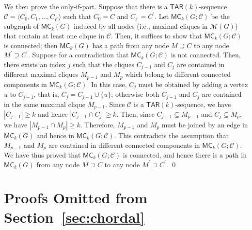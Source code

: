 \documentclass{llncs}
\newcommand{\MC}[2]{\mathsf{MC}_{#1}(#2)}
\newcommand{\TAR}[1]{\mathsf{TAR}(#1)}
\newcommand{\cliq}{C}
\newcommand{\Mset}[1]{\mathcal{M}(#1)}
\newcounter{one}
\begin{document}
	We then prove the only-if-part.
	Suppose that there is a $\TAR{k}$-sequence $\mathcal{C} = \langle \cliq_{0}, \cliq_{1}, \ldots, \cliq_{\ell^\prime} \rangle$ such that $\cliq_{0} = \cliq$ and $\cliq_{\ell^\prime} = \cliq^\prime$.
	Let $\MC{k}{G; \mathcal{C}}$ be the subgraph of $\MC{k}{G}$ induced by all nodes (i.e., maximal cliques in $\Mset{G}$) that contain at least one clique in $\mathcal{C}$.
	Then, it suffices to show that $\MC{k}{G; \mathcal{C}}$ is connected;
then $\MC{k}{G}$ has a path from any node $M \supseteq \cliq$ to any node $M^\prime \supseteq \cliq^\prime$. 
	Suppose for a contradiction that $\MC{k}{G; \mathcal{C}}$ is not connected. 
	Then, there exists an index $j$ such that the cliques $\cliq_{j-1}$ and $\cliq_j$ are contained in different maximal cliques $M_{p-1}$ and $M_p$ which belong to different connected components in $\MC{k}{G; \mathcal{C}}$. 
	In this case, $\cliq_{j}$ must be obtained by adding a vertex $u$ to $\cliq_{j-1}$, that is, $\cliq_{j} = \cliq_{j-1} \cup \{ u\}$;
otherwise both $\cliq_{j-1}$ and $\cliq_j$ are contained in the same maximal clique $M_{p-1}$.
	Since $\mathcal{C}$ is a $\TAR{k}$-sequence, we have $|\cliq_{j-1}| \ge k$ and hence $|\cliq_{j-1} \cap \cliq_j| \ge k$.
	Then, since $\cliq_{j-1} \subseteq M_{p-1}$ and $\cliq_j \subseteq M_p$, we have $|M_{p-1} \cap M_p| \ge k$. 
	Therefore, $M_{p-1}$ and $M_p$ must be joined by an edge in $\MC{k}{G}$ and hence in $\MC{k}{G; \mathcal{C}}$.
	This contradicts the assumption that $M_{p-1}$ and $M_{p}$ are contained in different connected components in $\MC{k}{G; \mathcal{C}}$. 
	We have thus proved that $\MC{k}{G; \mathcal{C}}$ is connected, and hence there is a path in $\MC{k}{G}$ from any node $M \supseteq \cliq$ to any node $M^\prime \supseteq \cliq^\prime$.
	\qed





	\section{Proofs Omitted from Section~\ref{sec:chordal}}
	
\end{document}

